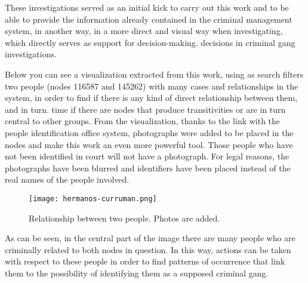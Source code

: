 These investigations served as an initial kick to carry out this work and to be able to provide the information already contained in the criminal management system, in another way, in a more direct and visual way when investigating, which directly serves as support for decision-making. decisions in criminal gang investigations.

Below you can see a visualization extracted from this work, using as 
search filters two people (nodes 116587 and 145262) with many cases and relationships in the system, in order to find if there is any kind of direct relationship between them, and in turn. time if there are nodes that produce transitivities or are in turn central to other groups.
From the visualization, thanks to the link with the people identification office system, photographs were added to be placed in the nodes and make this work an even more powerful tool. Those people who have not been identified in court will not have a photograph. For legal reasons, the photographs have been blurred and identifiers have been placed instead of the real names of the people involved.
\begin{figure}
	\centering
	\texttt{[image: hermanos-curruman.png]}
	\caption{Relationship between two people. Photos are added.} 
	\label{fig:hermanos-curruman}
\end{figure}

As can be seen, in the central part of the image there are many people who are criminally related to both nodes in question. In this way, actions can be taken with respect to these people in order to find patterns of occurrence that link them to the possibility of identifying them as a supposed criminal gang.
